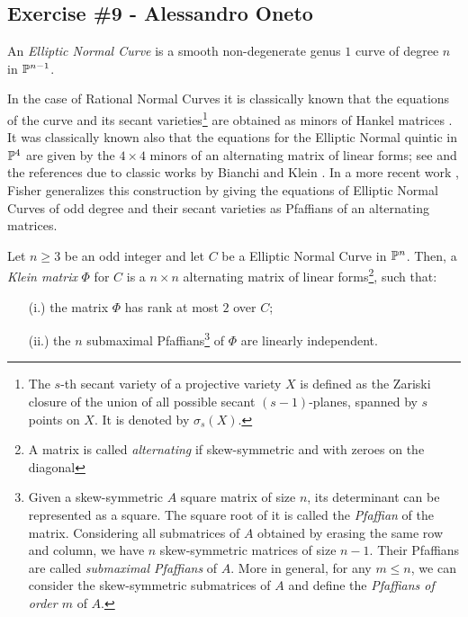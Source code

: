 
\subsection{Exercise \#9 - Alessandro Oneto}

\begin{defn}
 An {\it Elliptic Normal Curve} is a smooth non-degenerate genus $1$ curve of degree $n$ in $\P^{n-1}$.
\end{defn}

In the case of Rational Normal Curves it is classically known that the equations of the curve and its secant varieties\footnote{The $s$-th secant variety of a projective variety $X$ is defined as the Zariski closure of the union of all possible secant $(s-1)$-planes, spanned by $s$ points on $X$. It is denoted by $\sigma_s(X)$.} are obtained as minors of Hankel matrices \cite[Theorem 9.7]{harris-1992}. It was classically known also that the equations for the Elliptic Normal quintic in $\P^4$ are given by the $4\times 4$ minors of an alternating matrix of linear forms; see \cite[Lemma 4.4(i)]{ADHPR} and the references due to classic works by Bianchi \cite{bianchi-1880} and Klein \cite{KleinENC}. In a more recent work \cite{FisherENC}, Fisher generalizes this construction by giving the equations of Elliptic Normal Curves of odd degree and their secant varieties as Pfaffians of an alternating matrices.

\begin{defn}
 Let $n \geq 3$ be an odd integer and let $C$ be a Elliptic Normal Curve in $\P^n$. Then, a {\it Klein matrix} $\Phi$ for $C$ is a $n\times n$ alternating matrix of linear forms\footnote{A matrix is called {\it alternating} if skew-symmetric and with zeroes on the diagonal}, such that:
 \begin{itemize}
  \item[(i.)] the matrix $\Phi$ has rank at most $2$ over $C$;
  \item[(ii.)] the $n$ submaximal Pfaffians\footnote{Given a skew-symmetric $A$ square matrix of size $n$, its determinant can be represented as a square. The square root of it is called the {\it Pfaffian} of the matrix. Considering all submatrices of $A$ obtained by erasing the same row and column, we have $n$ skew-symmetric matrices of size $n-1$. Their Pfaffians are called {\it submaximal Pfaffians} of $A$. More in general, for any $m \leq n$, we can consider the skew-symmetric submatrices of $A$ and define the {\it Pfaffians of order $m$} of $A$.} of $\Phi$ are linearly independent.
 \end{itemize}
\end{defn}

